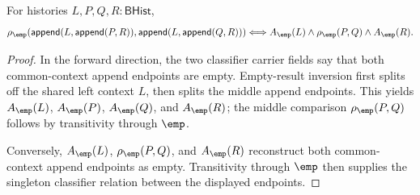 \begin{theorem}
\label{thm:matrix-singleton-classifier-append-common-context}
For histories $L,P,Q,R:\mathsf{BHist}$,
$$
\rho_{\emp}(\mathsf{append}(L,\mathsf{append}(P,R)),
  \mathsf{append}(L,\mathsf{append}(Q,R)))
\Longleftrightarrow
A_{\emp}(L)\land \rho_{\emp}(P,Q)\land A_{\emp}(R).
$$
\end{theorem}
\begin{proof}
In the forward direction, the two classifier carrier fields say that both
common-context append endpoints are empty. Empty-result inversion first splits
off the shared left context $L$, then splits the middle append endpoints. This
yields $A_{\emp}(L)$, $A_{\emp}(P)$, $A_{\emp}(Q)$, and $A_{\emp}(R)$; the
middle comparison $\rho_{\emp}(P,Q)$ follows by transitivity through $\emp$.

Conversely, $A_{\emp}(L)$, $\rho_{\emp}(P,Q)$, and $A_{\emp}(R)$ reconstruct
both common-context append endpoints as empty. Transitivity through $\emp$
then supplies the singleton classifier relation between the displayed
endpoints.
\end{proof}


